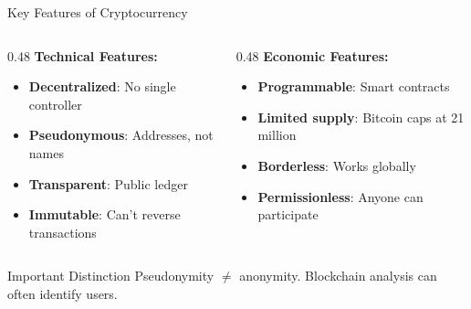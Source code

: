 ﻿\documentclass[aspectratio=169,11pt]{beamer}
\begin{document}
\begin{frame}{Key Features of Cryptocurrency}
\begin{columns}[T]
\begin{column}{0.48\textwidth}
\textbf{Technical Features:}
\begin{itemize}
    \item \textbf{Decentralized}: No single controller
    \item \textbf{Pseudonymous}: Addresses, not names
    \item \textbf{Transparent}: Public ledger
    \item \textbf{Immutable}: Can't reverse transactions
\end{itemize}
\end{column}
\begin{column}{0.48\textwidth}
\textbf{Economic Features:}
\begin{itemize}
    \item \textbf{Programmable}: Smart contracts
    \item \textbf{Limited supply}: Bitcoin caps at 21 million
    \item \textbf{Borderless}: Works globally
    \item \textbf{Permissionless}: Anyone can participate
\end{itemize}
\end{column}
\end{columns}

\vspace{0.5em}
\begin{alertblock}{Important Distinction}
Pseudonymity $\neq$ anonymity. Blockchain analysis can often identify users.
\end{alertblock}
\end{frame}
\end{document}
